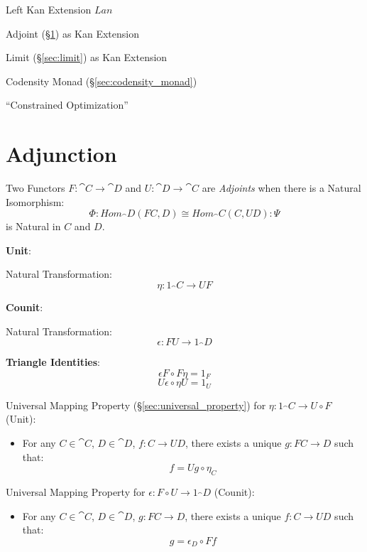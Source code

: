 Left Kan Extension $Lan$

Adjoint (\S\ref{sec:adjoint}) as Kan Extension

Limit (\S\ref{sec:limit}) as Kan Extension

Codensity Monad (\S\ref{sec:codensity_monad})

``Constrained Optimization'' %



\section{Adjunction}\label{sec:adjoint}


Two Functors $F : \cat{C} \rightarrow \cat{D}$ and $U : \cat{D}
\rightarrow \cat{C}$ are \emph{Adjoints} when there is a Natural
Isomorphism:
\[
  \Phi : Hom_\cat{D}(F C,D) \cong Hom_\cat{C}(C,U D) : \Psi
\]
is Natural in $C$ and $D$.

\textbf{Unit}:

Natural Transformation:
\[
  \eta : 1_\cat{C} \rightarrow U F
\]

\textbf{Counit}:

Natural Transformation:
\[
  \epsilon : F U \rightarrow 1_\cat{D}
\]

\textbf{Triangle Identities}:
\[
  \epsilon F \circ F \eta = 1_F
\]\[
  U \epsilon \circ \eta U = 1_U
\]

Universal Mapping Property (\S\ref{sec:universal_property}) for $\eta
: 1_\cat{C} \rightarrow U \circ F$ (Unit):

\begin{itemize}
\item For any $C \in \cat{C}$, $D \in \cat{D}$, $f : C
  \rightarrow U D$, there exists a unique $g : FC \rightarrow D$ such
  that:
  \[
    f = U g \circ \eta_C
  \]
\end{itemize}

Universal Mapping Property for $\epsilon : F \circ U \rightarrow
1_\cat{D}$ (Counit):

\begin{itemize}
\item For any $C \in \cat{C}$, $D \in \cat{D}$, $g : F C
  \rightarrow D$, there exists a unique $f : C \rightarrow U D$ such
  that:
  \[
    g = \epsilon_D \circ F f
  \]
\end{itemize}

